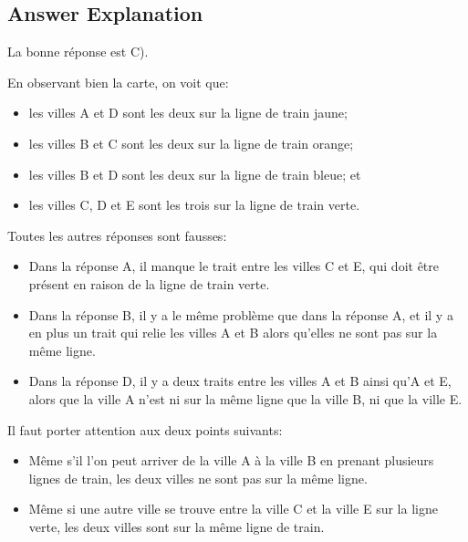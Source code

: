 \documentclass[a4paper,11pt]{report}
\newcommand{\taskGraphicsFolder}{..}
\begin{document}
\endgroup

\subsection*{Answer Explanation}

La bonne réponse est C).

{\centering%
\par}

En observant bien la carte, on voit que:

\begin{itemize}
  \item les villes A et D sont les deux sur la ligne de train jaune;
  \item les villes B et C sont les deux sur la ligne de train orange;
  \item les villes B et D sont les deux sur la ligne de train bleue; et
  \item les villes C, D et E sont les trois sur la ligne de train verte.
\end{itemize}

Toutes les autres réponses sont fausses:

\begin{itemize}
  \item Dans la réponse A, il manque le trait entre les villes C et E, qui doit être présent en raison de la ligne de train verte.
  \item Dans la réponse B, il y a le même problème que dans la réponse A, et il y a en plus un trait qui relie les villes A et B alors qu’elles ne sont pas sur la même ligne.
  \item Dans la réponse D, il y a deux traits entre les villes A et B ainsi qu’A et E, alors que la ville A n’est ni sur la même ligne que la ville B, ni que la ville E.
\end{itemize}

Il faut porter attention aux deux points suivants:

\begin{itemize}
  \item Même s’il l’on peut arriver de la ville A à la ville B en prenant plusieurs lignes de train, les deux villes ne sont pas sur la même ligne.
  \item Même si une autre ville se trouve entre la ville C et la ville E sur la ligne verte, les deux villes sont sur la même ligne de train.
\end{itemize}
\end{document}
